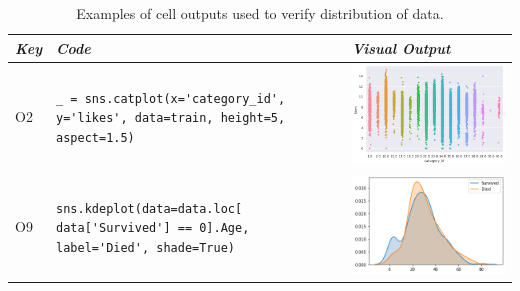 \begin{table}
  \centering
  \caption{Examples of cell outputs used to verify distribution of data.}
  \begin{tabular}{@{}m{} m{} m{}@{}}
    \toprule
    \emph{\textbf{Key}}&
    \emph{\textbf{Code}}&
    \emph{\textbf{Visual Output}}\\
    \midrule

    O2&
    \lstinline[]$_ = sns.catplot(x='category_id', y='likes', data=train, height=5, aspect=1.5)$&
    \includegraphics[width=\linewidth]{distribution-check-catplot.png}\\

    O9&
    \lstinline[]$sns.kdeplot(data=data.loc[ data['Survived'] == 0].Age, label='Died', shade=True)$&
    \includegraphics[width=\linewidth]{distribution-check-kdeplot.png}\\


\end{tabular}
\end{table}
